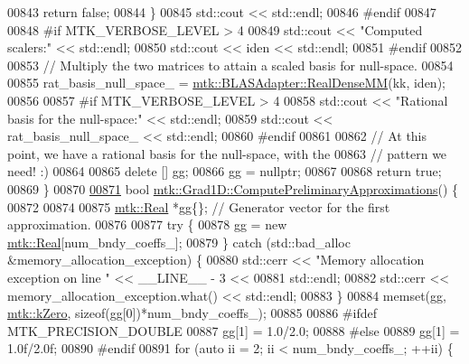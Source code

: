 \begin{DoxyCode}
{{00843     \textcolor{keywordflow}{return} \textcolor{keyword}{false};
00844   \}
00845   std::cout << std::endl;
00846 \textcolor{preprocessor}{  #endif}
00847 
00848 \textcolor{preprocessor}{  #if MTK\_VERBOSE\_LEVEL > 4}
00849   std::cout << \textcolor{stringliteral}{"Computed scalers:"} << std::endl;
00850   std::cout << iden << std::endl;
00851 \textcolor{preprocessor}{  #endif}
00852 
00853   \textcolor{comment}{// Multiply the two matrices to attain a scaled basis for null-space.}
00854 
00855   rat\_basis\_null\_space\_ = \hyperlink{classmtk_1_1BLASAdapter_acebd0e9bfe0bdd609c7fbea98ccfd3b5}{mtk::BLASAdapter::RealDenseMM}(kk, iden);
00856 
00857 \textcolor{preprocessor}{  #if MTK\_VERBOSE\_LEVEL > 4}
00858   std::cout << \textcolor{stringliteral}{"Rational basis for the null-space:"} << std::endl;
00859   std::cout << rat\_basis\_null\_space\_ << std::endl;
00860 \textcolor{preprocessor}{  #endif}
00861 
00862   \textcolor{comment}{// At this point, we have a rational basis for the null-space, with the}
00863   \textcolor{comment}{// pattern we need! :)}
00864 
00865   \textcolor{keyword}{delete} [] gg;
00866   gg = \textcolor{keyword}{nullptr};
00867 
00868   \textcolor{keywordflow}{return} \textcolor{keyword}{true};
00869 \}
00870 
\hypertarget{mtk__grad__1d_8cc_source_l00871}{}\hyperlink{classmtk_1_1Grad1D_add4c68a6e78d8b9c2b800b3f96f4757d}{00871} \textcolor{keywordtype}{bool} \hyperlink{classmtk_1_1Grad1D_add4c68a6e78d8b9c2b800b3f96f4757d}{mtk::Grad1D::ComputePreliminaryApproximations}() \{
00872 
00874 
00875   \hyperlink{group__c01-roots_gac080bbbf5cbb5502c9f00405f894857d}{mtk::Real} *gg\{\}; \textcolor{comment}{// Generator vector for the first approximation.}
00876 
00877   \textcolor{keywordflow}{try} \{
00878     gg = \textcolor{keyword}{new} \hyperlink{group__c01-roots_gac080bbbf5cbb5502c9f00405f894857d}{mtk::Real}[num\_bndy\_coeffs\_];
00879   \} \textcolor{keywordflow}{catch} (std::bad\_alloc &memory\_allocation\_exception) \{
00880     std::cerr << \textcolor{stringliteral}{"Memory allocation exception on line "} << \_\_LINE\_\_ - 3 <<
00881       std::endl;
00882     std::cerr << memory\_allocation\_exception.what() << std::endl;
00883   \}
00884   memset(gg, \hyperlink{group__c01-roots_ga59a451a5fae30d59649bcda274fea271}{mtk::kZero}, \textcolor{keyword}{sizeof}(gg[0])*num\_bndy\_coeffs\_);
00885 
00886 \textcolor{preprocessor}{  #ifdef MTK\_PRECISION\_DOUBLE}
00887   gg[1] = 1.0/2.0;
00888 \textcolor{preprocessor}{  #else}
00889   gg[1] = 1.0f/2.0f;
00890 \textcolor{preprocessor}{  #endif}
00891   \textcolor{keywordflow}{for} (\textcolor{keyword}{auto} ii = 2; ii < num\_bndy\_coeffs\_; ++ii) \{
}}
\end{DoxyCode}
